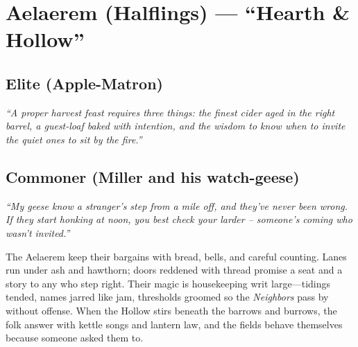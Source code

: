\section{Aelaerem (Halflings) --- ``Hearth \& Hollow''}
\label{chap:aelaerem}

\subsection*{Elite (Apple-Matron)}
\textit{``A proper harvest feast requires three things: the finest cider aged in the right barrel, a guest-loaf baked with intention, and the wisdom to know when to invite the quiet ones to sit by the fire.''}

\subsection*{Commoner (Miller and his watch-geese)}
\textit{``My geese know a stranger's step from a mile off, and they've never been wrong. If they start honking at noon, you best check your larder – someone's coming who wasn't invited.''}

\begin{tcolorbox}[colback=black!3,colframe=black!40!white,title={Hearth \& Hollow}]
The Aelaerem keep their bargains with bread, bells, and careful counting. Lanes run under ash and hawthorn; doors reddened with thread promise a seat and a story to any who step right. Their magic is housekeeping writ large---tidings tended, names jarred like jam, thresholds groomed so the \emph{Neighbors} pass by without offense. When the Hollow stirs beneath the barrows and burrows, the folk answer with kettle songs and lantern law, and the fields behave themselves because someone asked them to.
\end{tcolorbox}

